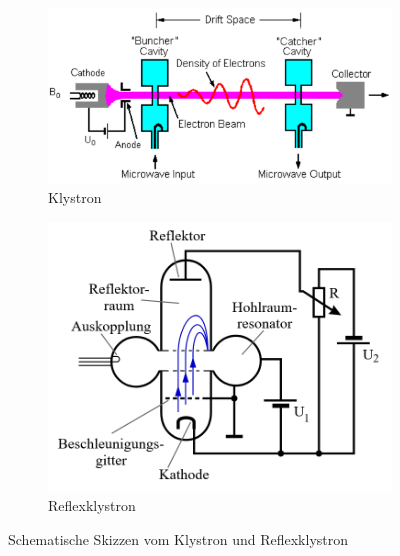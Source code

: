 \begin{figure}
    \centering
    \begin{subfigure}{0.45\textwidth}
        \centering
        \includegraphics[width=\textwidth]{images/klystron.png}
        \caption{Klystron}
        \label{fig:klystron}
    \end{subfigure}
    \begin{subfigure}{0.45\textwidth}
        \centering
        \includegraphics[width=\textwidth]{images/reflexklystron.png}
        \caption{Reflexklystron}
        \label{fig:reflexklystron}
    \end{subfigure}
    \caption{Schematische Skizzen vom Klystron und Reflexklystron \cite{wiki_klystron}}
    \label{fig:wiki_klystron}
\end{figure}

